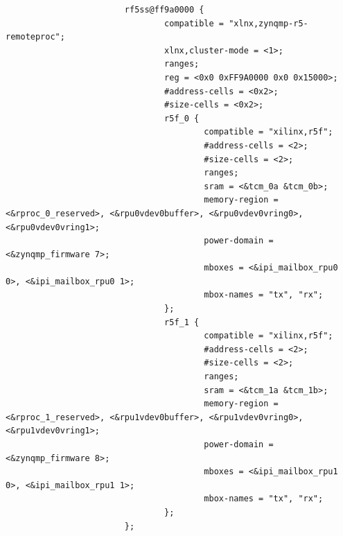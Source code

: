\documentclass[10pt]{article}
\begin{document}
\begin{verbatim}
                        rf5ss@ff9a0000 {
                                compatible = "xlnx,zynqmp-r5-remoteproc";
                                xlnx,cluster-mode = <1>;
                                ranges;
                                reg = <0x0 0xFF9A0000 0x0 0x15000>;
                                #address-cells = <0x2>;
                                #size-cells = <0x2>;
                                r5f_0 {
                                        compatible = "xilinx,r5f";
                                        #address-cells = <2>;
                                        #size-cells = <2>;
                                        ranges;
                                        sram = <&tcm_0a &tcm_0b>;
                                        memory-region = <&rproc_0_reserved>, <&rpu0vdev0buffer>, <&rpu0vdev0vring0>, <&rpu0vdev0vring1>;
                                        power-domain = <&zynqmp_firmware 7>;
                                        mboxes = <&ipi_mailbox_rpu0 0>, <&ipi_mailbox_rpu0 1>;
                                        mbox-names = "tx", "rx";
                                };
                                r5f_1 {
                                        compatible = "xilinx,r5f";
                                        #address-cells = <2>;
                                        #size-cells = <2>;
                                        ranges;
                                        sram = <&tcm_1a &tcm_1b>;
                                        memory-region = <&rproc_1_reserved>, <&rpu1vdev0buffer>, <&rpu1vdev0vring0>, <&rpu1vdev0vring1>;
                                        power-domain = <&zynqmp_firmware 8>;
                                        mboxes = <&ipi_mailbox_rpu1 0>, <&ipi_mailbox_rpu1 1>;
                                        mbox-names = "tx", "rx";
                                };
                        };


\end{verbatim}
\end{document}
